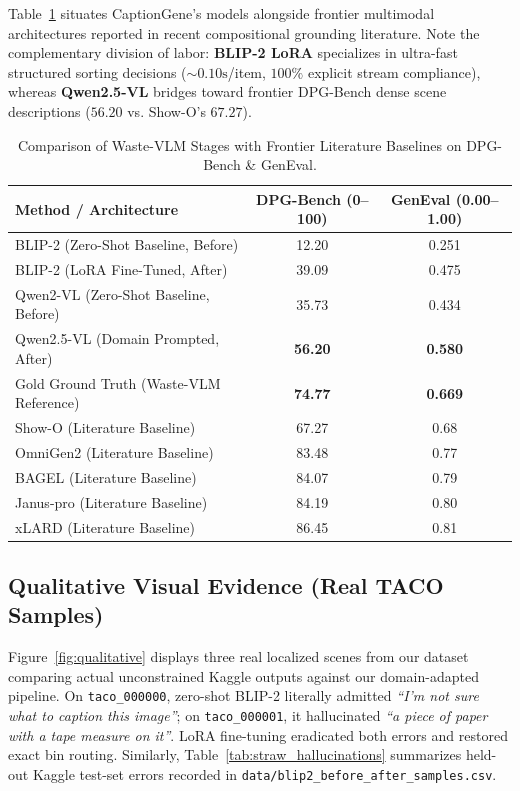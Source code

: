 \documentclass[11pt,a4paper]{article}
\begin{document}
Table~\ref{tab:frontier} situates CaptionGene's models alongside frontier multimodal architectures reported in recent compositional grounding literature. Note the complementary division of labor: \textbf{BLIP-2 LoRA} specializes in ultra-fast structured sorting decisions ($\sim 0.10\text{s}$/item, $100\%$ explicit stream compliance), whereas \textbf{Qwen2.5-VL} bridges toward frontier DPG-Bench dense scene descriptions ($56.20$ vs. Show-O's $67.27$).

\begin{table}[H]
\centering
\caption{Comparison of Waste-VLM Stages with Frontier Literature Baselines on DPG-Bench \& GenEval.}
\label{tab:frontier}
\begin{tabular}{@{}lcc@{}}
\toprule
\textbf{Method / Architecture} & \textbf{DPG-Bench (0--100)} & \textbf{GenEval (0.00--1.00)} \\
\midrule
BLIP-2 (Zero-Shot Baseline, Before) & 12.20 & 0.251 \\
BLIP-2 (LoRA Fine-Tuned, After) & 39.09 & 0.475 \\
Qwen2-VL (Zero-Shot Baseline, Before) & 35.73 & 0.434 \\
Qwen2.5-VL (Domain Prompted, After) & \textbf{56.20} & \textbf{0.580} \\
Gold Ground Truth (Waste-VLM Reference) & \textbf{74.77} & \textbf{0.669} \\
\midrule
Show-O (Literature Baseline) & 67.27 & 0.68 \\
OmniGen2 (Literature Baseline) & 83.48 & 0.77 \\
BAGEL (Literature Baseline) & 84.07 & 0.79 \\
Janus-pro (Literature Baseline) & 84.19 & 0.80 \\
xLARD (Literature Baseline) & 86.45 & 0.81 \\
\bottomrule
\end{tabular}
\end{table}

\subsection{Qualitative Visual Evidence (Real TACO Samples)}
Figure~\ref{fig:qualitative} displays three real localized scenes from our dataset comparing actual unconstrained Kaggle outputs against our domain-adapted pipeline. On \texttt{taco\_000000}, zero-shot BLIP-2 literally admitted \textit{``I'm not sure what to caption this image''}; on \texttt{taco\_000001}, it hallucinated \textit{``a piece of paper with a tape measure on it''}. LoRA fine-tuning eradicated both errors and restored exact bin routing. Similarly, Table~\ref{tab:straw_hallucinations} summarizes held-out Kaggle test-set errors recorded in \texttt{data/blip2\_before\_after\_samples.csv}.
\end{document}
